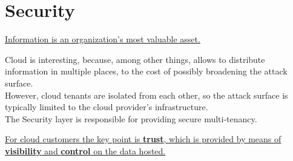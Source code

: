 \section{Security}
\ul{Information is an organization’s most valuable asset.}

Cloud is interesting, because, among other things, allows to distribute information in multiple places, to the cost of possibly broadening the attack surface.\\
However, cloud tenants are isolated from each other, so the attack surface is typically limited to the cloud provider's infrastructure.\\
The Security layer is responsible for providing secure multi-tenancy.

\begin{center}
   \ul{For cloud customers the key point is \textbf{trust}, which is provided by means of \textbf{visibility} and \textbf{control} on the data hosted.}
\end{center}

